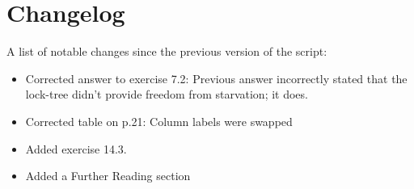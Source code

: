 \documentclass[main]{subfiles}
\begin{document}
\section{Changelog}
A list of notable changes since the previous version of the script:
\begin{itemize}
    \item Corrected answer to exercise 7.2: Previous answer incorrectly stated that the lock-tree didn't provide freedom from starvation; it does.
    \item Corrected table on p.21: Column labels were swapped
    \item Added exercise 14.3.
    \item Added a Further Reading section
\end{itemize}
\end{document}
